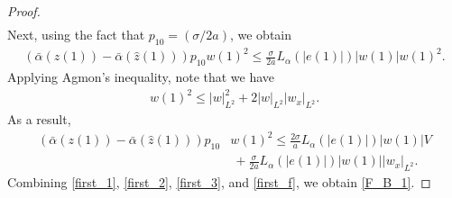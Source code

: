 \documentclass[10pt,a4paper]{amsart}
\begin{document}
\begin{proof}
\begin{align}
\end{align}
Next, using the fact that $p_{10}=(\sigma/2a)$, we obtain 
\begin{align*}
\left(\bar{\alpha}(z(1))-\bar{\alpha}(\hat{z}(1))\right)p_{10}w(1)^2 \leq \frac{\sigma}{2a}L_{\alpha}(|e(1)|)|w(1)|w(1)^2.
\end{align*}
Applying Agmon's inequality, note that we have 
\begin{align*}
w(1)^2 \leq |w|_{L^2}^2+2|w|_{L^2}|w_x|_{L^2}. 
\end{align*}
As a result, 
\begin{align}
\left(\bar{\alpha}(z(1))-\bar{\alpha}(\hat{z}(1))\right)p_{10}&w(1)^2 \leq \frac{2\sigma}{a}L_{\alpha}(|e(1)|)|w(1)| V \nonumber \\
&~+\frac{\sigma}{2a}L_{\alpha}(|e(1)|)|w(1)| |w_x|_{L^2}. \label{first_f}
\end{align}
Combining \eqref{first_1}, \eqref{first_2}, \eqref{first_3}, and \eqref{first_f}, we obtain \eqref{F_B_1}. 
\end{proof}
\end{document}
